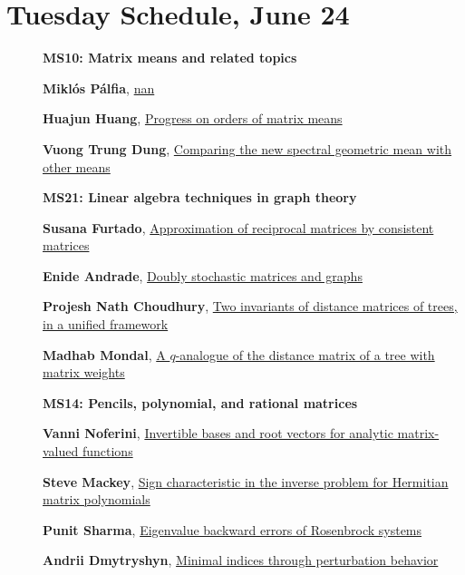 \documentclass[ILAS2025-program.tex]{subfiles}
\begin{document}
\section*{Tuesday Schedule, June 24 }
        
        \begin{description}
    \item[] {\color{mstitle}\textbf{MS10: Matrix means and related topics}} 
    \item[] \hypertarget{up0132}{}\textbf{Miklós Pálfia}, \hyperlink{down0132}{nan}
        \item[] \hypertarget{up0133}{}\textbf{Huajun Huang}, \hyperlink{down0133}{Progress on orders of matrix means}
        \item[] \hypertarget{up0134}{}\textbf{Vuong Trung Dung}, \hyperlink{down0134}{Comparing the new spectral geometric mean with other means}
        \end{description}
    \begin{description}
    \item[] {\color{mstitle}\textbf{MS21: Linear algebra techniques in graph theory}} 
    \item[] \hypertarget{up0169}{}\textbf{Susana Furtado}, \hyperlink{down0169}{Approximation of reciprocal matrices by consistent matrices}
        \item[] \hypertarget{up0170}{}\textbf{Enide Andrade}, \hyperlink{down0170}{Doubly stochastic matrices and graphs}
        \item[] \hypertarget{up0171}{}\textbf{Projesh Nath Choudhury}, \hyperlink{down0171}{Two invariants of distance matrices of trees, in a unified framework}
        \item[] \hypertarget{up0172}{}\textbf{Madhab Mondal}, \hyperlink{down0172}{A $q$-analogue of the distance matrix of a tree with matrix weights}
        \end{description}
    \begin{description}
    \item[] {\color{mstitle}\textbf{MS14: Pencils, polynomial, and rational matrices}} 
    \item[] \hypertarget{up0213}{}\textbf{Vanni Noferini}, \hyperlink{down0213}{Invertible bases and root vectors for analytic matrix-valued functions}
        \item[] \hypertarget{up0214}{}\textbf{Steve Mackey}, \hyperlink{down0214}{Sign characteristic in the inverse problem for Hermitian matrix polynomials}
        \item[] \hypertarget{up0215}{}\textbf{Punit Sharma}, \hyperlink{down0215}{Eigenvalue backward errors of Rosenbrock systems}
        \item[] \hypertarget{up0216}{}\textbf{Andrii Dmytryshyn}, \hyperlink{down0216}{Minimal indices through perturbation behavior}
        \end{description}
    \newpage
\end{document}
